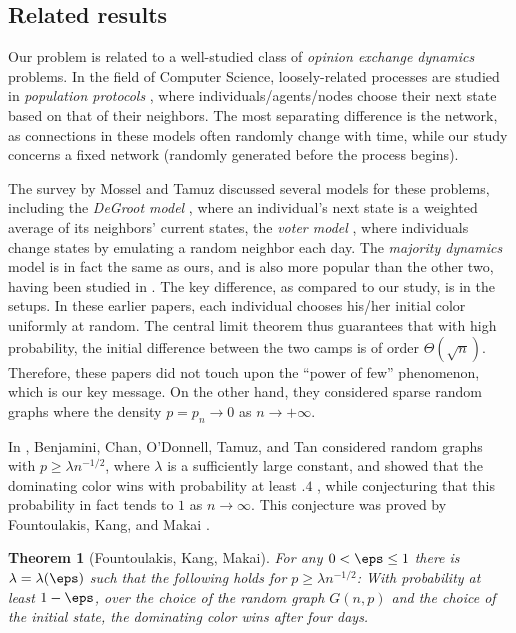 \documentclass[11pt]{article}
\numberwithin{equation}{section}
\newtheorem{theorem}{Theorem}[section]
\theoremstyle{definition}
\theoremstyle{plain}
\begin{document}
			
			\subsection{Related results}
			
			Our problem is related to a %
			well-studied  %
			class of \emph{opinion exchange dynamics} problems. In the field of Computer Science, loosely-related processes are studied in \emph{population protocols} \cite{alistarh2015, alistarh2017}, where individuals/agents/nodes choose their next state based on that of their neighbors. The most separating difference is the network, as connections in these models often randomly change with time, while our study concerns a fixed network (randomly generated before the process begins).
			
			The survey by Mossel and Tamuz \cite{mossel2017} discussed %
			several  %
			models for these problems, including the \emph{DeGroot model} \cite{degroot1974}, where an individual's next state is a weighted average of its neighbors' current states, the \emph{voter model} \cite{clifford1973}, where individuals change states by emulating a random neighbor each day. The \emph{majority dynamics} model is in fact the same as ours, and is also more popular than the other two, having been studied in \cite{mossel2014, fountoulakis, benjamini}. The key difference, as compared to our study,  is in the %
			setups.  %
			In these earlier papers, each individual chooses his/her initial color uniformly at random. The central limit theorem thus guarantees that with high probability, the initial difference between the two camps is of order $\Theta (\sqrt n) $. Therefore, these papers did not touch upon the ``power of few'' phenomenon, which is our key message. On the other hand,  they considered sparse random graphs where the density $p = p_n\to 0$ as $n \to +\infty$.
			
			In \cite{benjamini}, Benjamini, Chan, O'Donnell, Tamuz, and Tan considered random graphs with $p \ge \lambda n^{-1/2} $, where $\lambda $ is a sufficiently large constant, and showed that the dominating color wins with probability at least $.4$ \cite[Theorem 1.2]{benjamini}, while conjecturing that this probability in fact tends to $1$ as $n \to \infty$. This conjecture was proved by Fountoulakis, Kang, and Makai
			\cite[Theorem 1.1]{fountoulakis}.
			
			\begin{theorem}[Fountoulakis, Kang, Makai]  \label{FKM}
				For any $0< \eps \le 1$ there is $\lambda = \lambda(\eps)$ such that the following holds for $p \ge \lambda n^{-1/2} $:
				With probability at least $1 -\eps$, over the choice of the random graph $G(n,p)$
				and the choice of the initial state, the dominating color wins after four days.
			\end{theorem}
			
\end{document}
